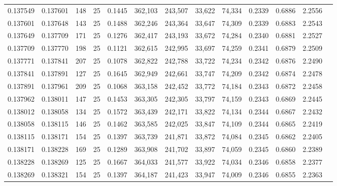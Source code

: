 \begin{tabular}{rrrrrrrrrrrrr}
0.137549 & 0.137601 &   148 &  25 &                                     0.1445 & 362,103 & 243,507 &  33,622 &  74,334 & 0.2339 & 0.6886 & 2.2556 \\
0.137601 & 0.137648 &   143 &  25 &                                     0.1488 & 362,246 & 243,364 &  33,647 &  74,309 & 0.2339 & 0.6883 & 2.2543 \\
0.137649 & 0.137709 &   171 &  25 &                                     0.1276 & 362,417 & 243,193 &  33,672 &  74,284 & 0.2340 & 0.6881 & 2.2527 \\
0.137709 & 0.137770 &   198 &  25 &                                     0.1121 & 362,615 & 242,995 &  33,697 &  74,259 & 0.2341 & 0.6879 & 2.2509 \\
0.137771 & 0.137841 &   207 &  25 &                                     0.1078 & 362,822 & 242,788 &  33,722 &  74,234 & 0.2342 & 0.6876 & 2.2490 \\
0.137841 & 0.137891 &   127 &  25 &                                     0.1645 & 362,949 & 242,661 &  33,747 &  74,209 & 0.2342 & 0.6874 & 2.2478 \\
0.137891 & 0.137961 &   209 &  25 &                                     0.1068 & 363,158 & 242,452 &  33,772 &  74,184 & 0.2343 & 0.6872 & 2.2458 \\
0.137962 & 0.138011 &   147 &  25 &                                     0.1453 & 363,305 & 242,305 &  33,797 &  74,159 & 0.2343 & 0.6869 & 2.2445 \\
0.138012 & 0.138058 &   134 &  25 &                                     0.1572 & 363,439 & 242,171 &  33,822 &  74,134 & 0.2344 & 0.6867 & 2.2432 \\
0.138058 & 0.138115 &   146 &  25 &                                     0.1462 & 363,585 & 242,025 &  33,847 &  74,109 & 0.2344 & 0.6865 & 2.2419 \\
0.138115 & 0.138171 &   154 &  25 &                                     0.1397 & 363,739 & 241,871 &  33,872 &  74,084 & 0.2345 & 0.6862 & 2.2405 \\
0.138171 & 0.138228 &   169 &  25 &                                     0.1289 & 363,908 & 241,702 &  33,897 &  74,059 & 0.2345 & 0.6860 & 2.2389 \\
0.138228 & 0.138269 &   125 &  25 &                                     0.1667 & 364,033 & 241,577 &  33,922 &  74,034 & 0.2346 & 0.6858 & 2.2377 \\
0.138269 & 0.138321 &   154 &  25 &                                     0.1397 & 364,187 & 241,423 &  33,947 &  74,009 & 0.2346 & 0.6855 & 2.2363 \\

\end{tabular}

